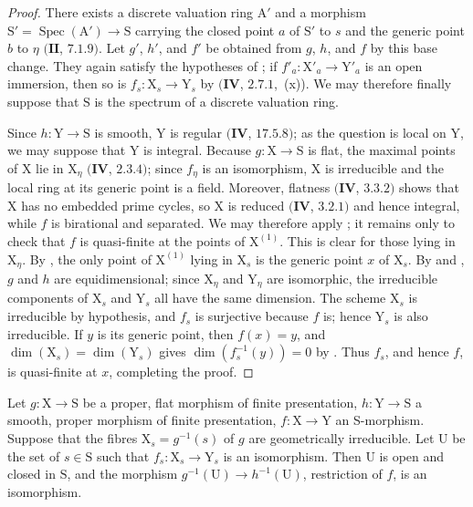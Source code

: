 \begin{proof}
There exists a discrete valuation ring $\mathrm{A}'$ and a morphism $\mathrm{S}'=\operatorname{Spec}(\mathrm{A}')\to\mathrm{S}$ carrying the closed point $a$ of $\mathrm{S}'$ to $s$ and the generic point $b$ to $\eta$ $(\mathbf{II}$, $7.1.9)$.  Let $g'$, $h'$, and $f'$ be obtained from $g$, $h$, and $f$ by this base change.  They again satisfy the hypotheses of ; if $f'_a:\mathrm{X}'_a\to\mathrm{Y}'_a$ is an open immersion, then so is $f_s:\mathrm{X}_s\to\mathrm{Y}_s$ by $(\mathbf{IV}$, $2.7.1$,~(x)).  We may therefore finally suppose that $\mathrm{S}$ is the spectrum of a discrete valuation ring.

Since $h:\mathrm{Y}\to\mathrm{S}$ is smooth, $\mathrm{Y}$ is regular $(\mathbf{IV}$, $17.5.8)$; as the question is local on $\mathrm{Y}$, we may suppose that $\mathrm{Y}$ is integral.
Because $g:\mathrm{X}\to\mathrm{S}$ is flat, the maximal points of $\mathrm{X}$ lie in $\mathrm{X}_\eta$ $(\mathbf{IV}$, $2.3.4)$; since $f_\eta$ is an isomorphism, $\mathrm{X}$ is irreducible and the local ring at its generic point is a field.  Moreover, flatness $(\mathbf{IV}$, $3.3.2)$ shows that $\mathrm{X}$ has no embedded prime cycles, so $\mathrm{X}$ is reduced $(\mathbf{IV}$, $3.2.1)$ and hence integral, while $f$ is birational and separated.
We may therefore apply ; it remains only to check that $f$ is quasi-finite at the points of $\mathrm{X}^{(1)}$.  This is clear for those lying in $\mathrm{X}_\eta$.  By , the only point of $\mathrm{X}^{(1)}$ lying in $\mathrm{X}_s$ is the generic point $x$ of $\mathrm{X}_s$.
By  and , $g$ and $h$ are equidimensional; since $\mathrm{X}_\eta$ and $\mathrm{Y}_\eta$ are isomorphic, the irreducible components of $\mathrm{X}_s$ and $\mathrm{Y}_s$ all have the same dimension.  The scheme $\mathrm{X}_s$ is irreducible by hypothesis, and $f_s$ is surjective because $f$ is; hence $\mathrm{Y}_s$ is also irreducible.  If $y$ is its generic point, then $f(x)=y$, and $\dim(\mathrm{X}_s)=\dim(\mathrm{Y}_s)$ gives $\dim(f_s^{-1}(y))=0$ by .  Thus $f_s$, and hence $f$, is quasi-finite at $x$, completing the proof.
\end{proof}

\begin{corollary}[21.12.16]
\label{IV.21.12.16}
Let $g:\mathrm{X}\to\mathrm{S}$ be a proper, flat morphism of finite presentation, $h:\mathrm{Y}\to\mathrm{S}$ a smooth, proper morphism of finite presentation, $f:\mathrm{X}\to\mathrm{Y}$ an S-morphism.
Suppose that the fibres $\mathrm{X}_s=g^{-1}(s)$ of $g$ are geometrically irreducible.
Let $\mathrm{U}$ be the set of $s\in\mathrm{S}$ such that $f_s:\mathrm{X}_s\to\mathrm{Y}_s$ is an isomorphism.
Then $\mathrm{U}$ is open and closed in $\mathrm{S}$, and the morphism $g^{-1}(\mathrm{U})\to h^{-1}(\mathrm{U})$, restriction of $f$, is an isomorphism.
\end{corollary}

